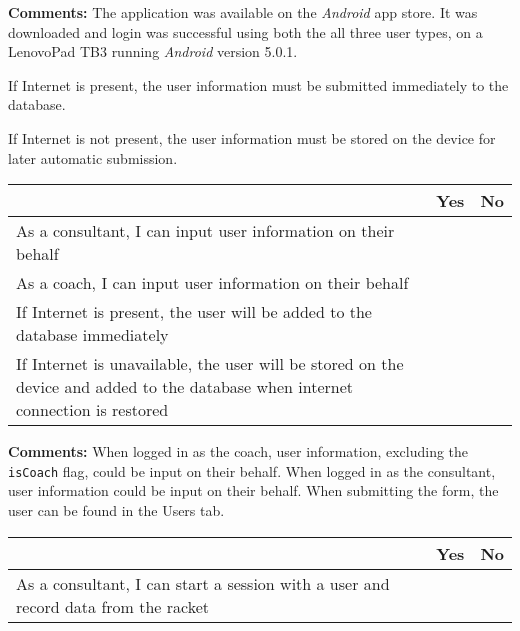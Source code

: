 \vspace{3mm}
\textbf{Comments:}
The application was available on the \textit{Android} app store. 
It was downloaded and login was successful using both the all three user types, on a LenovoPad TB3 running \textit{Android} version 5.0.1.

\vspace{3mm}


If Internet is present, the user information must be submitted immediately to the database.

If Internet is not present, the user information must be stored on the device for later automatic submission.

\begin{tabularx}{\textwidth}{|b|c|c|}
	\hline
	 & Yes & No \\
	\hline
	As a consultant, I can input user information on their behalf & \xmark  &  \\
	\hline
	As a coach, I can input user information on their behalf & \xmark  &  \\
	\hline
	If Internet is present, the user will be added to the database immediately & \xmark & \\
	\hline
	If Internet is unavailable, the user will be stored on the device and added to the database when internet connection is restored &  & \xmark  \\
	\hline
\end{tabularx}
	
\vspace{3mm}
\textbf{Comments:}
When logged in as the coach, user information, excluding the \verb+isCoach+ flag, could be input on their behalf.
When logged in as the consultant, user information could be input on their behalf.
When submitting the form, the user can be found in the Users tab.
\vspace{3mm}


\begin{tabularx}{\textwidth}{|b|c|c|}
	\hline    
	 & Yes & No \\
	\hline
	As a consultant, I can start a session with a user and record data from the racket &   & \xmark  \\
	\hline
\end{tabularx}
	
